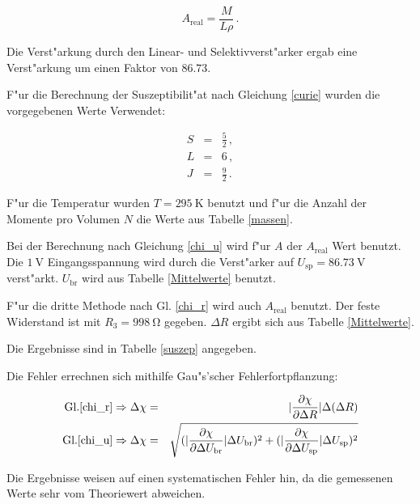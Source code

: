 	\begin{equation}
		A_\mathrm{real} = \frac{M}{L \rho} \, .
	\end{equation}

	Die Verst"arkung durch den Linear- und Selektivverst"arker ergab eine Verst"arkung um einen Faktor von $86.73$.

	F"ur die Berechnung der Suszeptibilit"at nach Gleichung \eqref{curie} wurden die vorgegebenen Werte Verwendet:

	\begin{eqnarray*}
		S &=& \frac{5}{2} \, ,\\
		L &=& 6 \, ,\\
		J &=& \frac{9}{2} \, .
	\end{eqnarray*}

	F"ur die Temperatur wurden $T = \SI{295}{\kelvin}$ benutzt und f"ur die Anzahl der Momente pro Volumen $N$ die Werte aus Tabelle \ref{massen}.

	Bei der Berechnung nach Gleichung \eqref{chi_u} wird f"ur $A$ der $A_\mathrm{real}$ Wert benutzt. Die $\SI{1}{\volt}$ Eingangsspannung wird durch die Verst"arker auf $U_\mathrm{sp} = \SI{86.73}{\volt}$ verst"arkt.
	$U_\mathrm{br}$ wird aus Tabelle \ref{Mittelwerte} benutzt.

	F"ur die dritte Methode nach Gl. \eqref{chi_r} wird auch $A_\mathrm{real}$ benutzt. Der feste Widerstand ist mit $R_\mathrm{3} = \SI{998}{\ohm}$ gegeben.
	$\Delta R$ ergibt sich aus Tabelle \ref{Mittelwerte}.

	Die Ergebnisse sind in Tabelle \ref{suszep} angegeben.

	Die Fehler errechnen sich mithilfe Gau"s'scher Fehlerfortpflanzung:

	\begin{eqnarray*}

	\text{Gl.} \eqref{chi_r} \Rightarrow \Delta \chi &=& |\frac{\partial \chi}{\partial \Delta R}| \Delta (\Delta R)\\
	\text{Gl.} \eqref{chi_u} \Rightarrow \Delta \chi &=& \sqrt{(|\frac{\partial \chi}{\partial \Delta U_\mathrm{br}}| \Delta U_\mathrm{br})^2 + (|\frac{\partial \chi}{\partial \Delta U_\mathrm{sp}}| \Delta U_\mathrm{sp})^2}\\

	\end{eqnarray*}

	Die Ergebnisse weisen auf einen systematischen Fehler hin, da die gemessenen Werte sehr vom Theoriewert abweichen.

	
	
	
	
	
	
	

	\clearpage